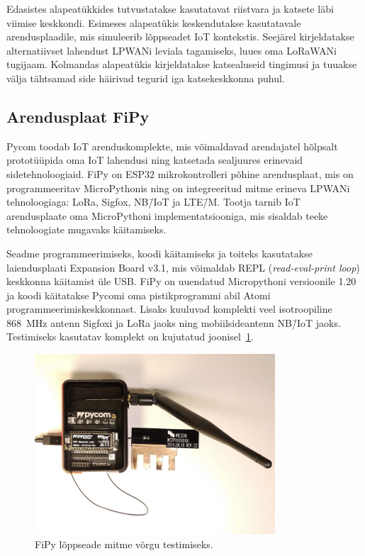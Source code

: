 \documentclass[12pt]{article}
\begin{document}
    Edasistes alapeatükkides tutvustatakse kasutatavat riistvara ja katsete läbi viimise keskkondi.
    Esimeses alapeatükis keskendutakse kasutatavale arendusplaadile, mis simuleerib lõppseadet IoT kontekstis.
    Seejärel kirjeldatakse alternatiivset lahendust LPWANi leviala tagamiseks, luues oma LoRaWANi tugijaam.
    Kolmandas alapeatükis kirjeldatakse katsealuseid tingimusi ja tuuakse välja tähtsamad side häirivad tegurid iga katsekeskkonna puhul.

    \subsection{Arendusplaat FiPy}

    Pycom toodab IoT arenduskomplekte, mis võimaldavad arendajatel hõlpsalt prototüüpida oma IoT lahendusi ning katsetada sealjuures erinevaid sidetehnoloogiaid.
    FiPy on ESP32 mikrokontrolleri põhine arendusplaat, mis on programmeeritav MicroPythonis ning on integreeritud mitme erineva LPWANi tehnoloogiaga: LoRa, Sigfox, NB\=/IoT ja LTE\=/M.
    Tootja tarnib IoT arendusplaate oma MicroPythoni implementatsiooniga, mis sisaldab teeke tehnoloogiate mugavaks käitamiseks.

    Seadme programmeerimiseks, koodi käitamiseks ja toiteks kasutatakse laiendusplaati Expansion Board v3.1, mis võimaldab REPL (\textit{read-eval-print loop}) keskkonna käitamist üle USB.
    FiPy on uuendatud Micropythoni versioonile 1.20 ja koodi käitatakse Pycomi oma pistikprogrammi abil Atomi programmeerimiskeskkonnast.
    Lisaks kuuluvad komplekti veel isotroopiline \SI{868}{\mega\hertz} antenn Sigfoxi ja LoRa jaoks ning mobiilsideantenn NB\=/IoT jaoks.
    Testimiseks kasutatav komplekt on kujutatud joonisel~\ref{fig:fipy}.

    \begin{figure} [ht] %
        \begin{center}
            \includegraphics[width=0.8\textwidth]{figures/fipy.jpg}
            \caption{FiPy lõppseade mitme võrgu testimiseks.}
            \label{fig:fipy}
        \end{center}
    \end{figure}
\end{document}
